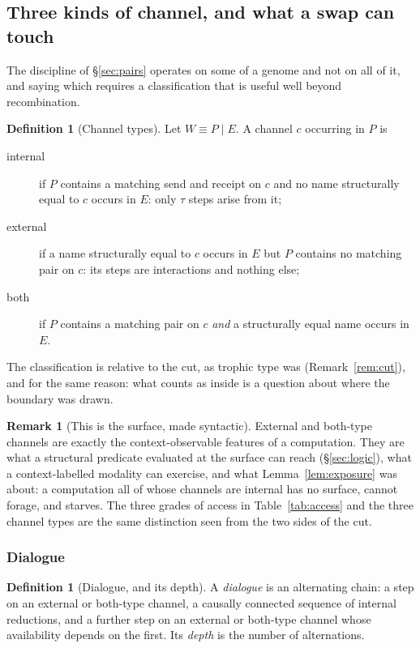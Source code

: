 \documentclass[11pt]{article}
\theoremstyle{plain}
\theoremstyle{definition}
\newtheorem{definition}[theorem]{Definition}
\newtheorem{remark}[theorem]{Remark}
\begin{document}
\subsection{Three kinds of channel, and what a swap can touch}
\label{sec:chantypes}

The discipline of \S\ref{sec:pairs} operates on some of a genome and not on all of it, and saying
which requires a classification that is useful well beyond recombination.

\begin{definition}[Channel types]
\label{def:chantypes}
Let $W \equiv P \mid E$. A channel $c$ occurring in $P$ is
\begin{description}
\item[internal] if $P$ contains a matching send and receipt on $c$ and no name structurally equal to
$c$ occurs in $E$: only $\tau$ steps arise from it;
\item[external] if a name structurally equal to $c$ occurs in $E$ but $P$ contains no matching pair on
$c$: its steps are interactions and nothing else;
\item[both] if $P$ contains a matching pair on $c$ \emph{and} a structurally equal name occurs in $E$.
\end{description}
\end{definition}

The classification is relative to the cut, as trophic type was (Remark~\ref{rem:cut}), and for the
same reason: what counts as inside is a question about where the boundary was drawn.

\begin{remark}[This is the surface, made syntactic]
\label{rem:surfacesyntax}
External and both-type channels are exactly the context-observable features of a computation. They
are what a structural predicate evaluated at the surface can reach (\S\ref{sec:logic}), what a
context-labelled modality can exercise, and what Lemma~\ref{lem:exposure} was about: a computation all
of whose channels are internal has no surface, cannot forage, and starves. The three grades of access
in Table~\ref{tab:access} and the three channel types are the same distinction seen from the two sides
of the cut.
\end{remark}

\subsubsection*{Dialogue}

\begin{definition}[Dialogue, and its depth]
\label{def:dialogue}
A \emph{dialogue} is an alternating chain: a step on an external or both-type channel, a causally
connected sequence of internal reductions, and a further step on an external or both-type channel
whose availability depends on the first. Its \emph{depth} is the number of alternations.
\end{definition}
\end{document}

